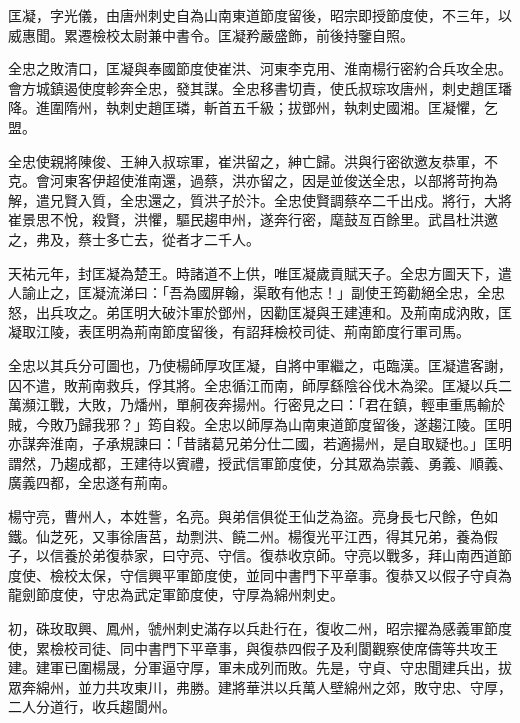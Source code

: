 \begin{pinyinscope}
 匡凝，字光儀，由唐州刺史自為山南東道節度留後，昭宗即授節度使，不三年，以威惠聞。累遷檢校太尉兼中書令。匡凝矜嚴盛飾，前後持鑒自照。



 全忠之敗清口，匡凝與奉國節度使崔洪、河東李克用、淮南楊行密約合兵攻全忠。會方城鎮遏使度軫奔全忠，發其謀。全忠移書切責，使氏叔琮攻唐州，刺史趙匡璠降。進圍隋州，執刺史趙匡璘，斬首五千級；拔鄧州，執刺史國湘。匡凝懼，乞盟。



 全忠使親將陳俊、王紳入叔琮軍，崔洪留之，紳亡歸。洪與行密欲邀友恭軍，不克。會河東客伊超使淮南還，過蔡，洪亦留之，因是並俊送全忠，以部將苛拘為解，遣兄賢入質，全忠還之，質洪子於汴。全忠使賢調蔡卒二千出戍。將行，大將崔景思不悅，殺賢，洪懼，驅民趨申州，遂奔行密，麾鼓亙百餘里。武昌杜洪邀之，弗及，蔡士多亡去，從者才二千人。



 天祐元年，封匡凝為楚王。時諸道不上供，唯匡凝歲貢賦天子。全忠方圖天下，遣人諭止之，匡凝流涕曰：「吾為國屏翰，渠敢有他志！」副使王筠勸絕全忠，全忠怒，出兵攻之。弟匡明大破汴軍於鄧州，因勸匡凝與王建連和。及荊南成汭敗，匡凝取江陵，表匡明為荊南節度留後，有詔拜檢校司徒、荊南節度行軍司馬。



 全忠以其兵分可圖也，乃使楊師厚攻匡凝，自將中軍繼之，屯臨漢。匡凝遣客謝，囚不遣，敗荊南救兵，俘其將。全忠循江而南，師厚繇陰谷伐木為梁。匡凝以兵二萬瀕江戰，大敗，乃燔州，單舸夜奔揚州。行密見之曰：「君在鎮，輕車重馬輸於賊，今敗乃歸我邪？」筠自殺。全忠以師厚為山南東道節度留後，遂趨江陵。匡明亦謀奔淮南，子承規諫曰：「昔諸葛兄弟分仕二國，若適揚州，是自取疑也。」匡明謂然，乃趨成都，王建待以賓禮，授武信軍節度使，分其眾為崇義、勇義、順義、廣義四都，全忠遂有荊南。



 楊守亮，曹州人，本姓訾，名亮。與弟信俱從王仙芝為盜。亮身長七尺餘，色如鐵。仙芝死，又事徐唐莒，劫剽洪、饒二州。楊復光平江西，得其兄弟，養為假子，以信養於弟復恭家，曰守亮、守信。復恭收京師。守亮以戰多，拜山南西道節度使、檢校太保，守信興平軍節度使，並同中書門下平章事。復恭又以假子守貞為龍劍節度使，守忠為武定軍節度使，守厚為綿州刺史。



 初，硃玫取興、鳳州，虢州刺史滿存以兵赴行在，復收二州，昭宗擢為感義軍節度使，累檢校司徒、同中書門下平章事，與復恭四假子及利閬觀察使席儔等共攻王建。建軍已圍楊晟，分軍逼守厚，軍未成列而敗。先是，守貞、守忠聞建兵出，拔眾奔綿州，並力共攻東川，弗勝。建將華洪以兵萬人壁綿州之郊，敗守忠、守厚，二人分道行，收兵趨閬州。




\end{pinyinscope}
